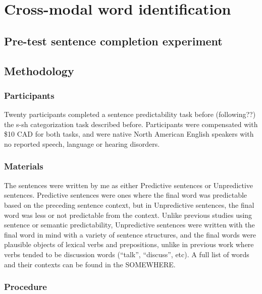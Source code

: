 
\chapter{Cross-modal word identification}

\section{Pre-test sentence completion experiment}

\section{Methodology}

\subsection{Participants}

Twenty participants completed a sentence predictability task before (following??) the s-sh categorization task described before. Participants were compensated with \$10 CAD for both tasks, and were native North American English speakers with no reported speech, language or hearing disorders.

\subsection{Materials}

The sentences were written by me as either Predictive sentences or Unpredictive sentences.  Predictive sentences were ones where the final word was predictable based on the preceding sentence context, but in Unpredictive sentences, the final word was less or not predictable from the context.  Unlike previous studies using sentence or semantic predictability, Unpredictive sentences were written with the final word in mind with a variety of sentence structures, and the final words were plausible objects of lexical verbs and prepositions, unlike in previous work where verbs tended to be discussion words (``talk'', ``discuss'', etc).  A full list of words and their contexts can be found in the SOMEWHERE.

\subsection{Procedure}

